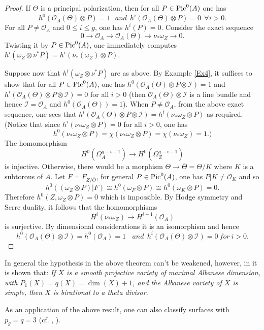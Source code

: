 \documentclass[10pt]{amsart}
\newcommand\Pic{{\text{\rm Pic}}}
\newcommand\lra{\longrightarrow}
\newcommand\ot{{\otimes}}
\newcommand\OO{{\mathcal{O}}}
\newcommand\II{{\mathcal{I}}}
\begin{document}
\begin{proof} If $\Theta$ is a principal polarization, then
for all $P\in \Pic ^0(A)$ one has $$h^0(\OO _A(\Theta )\ot P)=1\ \ \  and
\ \ h^i(\OO _A(\Theta )\ot P)=0\ \  \forall i>0.$$
For all $P\ne \OO _A$ and $0\leq i\leq g$, one has $h^i(P)=0$.
Consider the exact sequence
$$0\lra \OO _A \lra \OO _A (\Theta )\lra \nu _*\omega _Z\lra 0.$$
Twisting it by $P\in \Pic ^0(A)$, one immediately computes
$h^i(\omega _Z \ot \nu ^* P)=h^i(\nu _*(\omega _Z )\ot P)$.

Suppose now that $h^i(\omega _Z \ot \nu ^* P)$ are as above.
By Example \ref{Ex4}, 
it suffices to show that for all $P\in \Pic ^0(A)$, one has
$h^0(\OO _A(\Theta )\ot P \ot \II )=1$ and
$h^i(\OO _A (\Theta )\ot P \ot \II )=0$ for all $i>0$
(then $\OO _A (\Theta )\ot \II$ is a line bundle and hence $\II=\OO _A$
and $h^0(\OO _A(\Theta ))=1$).
When $P\ne \OO _A$, from the above exact sequence, one sees that 
$h^i(\OO _A (\Theta )\ot P \ot \II )=h^i(\nu _*\omega _Z \ot P)$
as required. (Notice that since $h^i(\nu _*\omega _Z \ot P)=0$ for
all $i>0$, one has $$h^0(\nu _*\omega _Z \ot P)=\chi (\nu _*\omega _Z \ot P)=
\chi (\nu _*\omega _Z)=1.)$$
The homomorphism $$H^0(\Omega _A^{g-i-1})\lra 
H^0(\Omega _Z ^{g-i-1})$$ is injective.
Otherwise, there would be a morphism $\Theta \lra \bar{\Theta}=
\Theta /K$ where $K$ is a subtorous of $A$. Let $F=F_{Z/\bar{\Theta }}$,
for general $P\in \Pic ^0(A)$, one has $P|K\ne \OO _K$
and so $$h^0((\omega _Z\ot P)|F)\cong h^0(\omega _F\ot P)\cong
h^0(\omega _K \ot P)=0.$$
Therefore $h^0(Z,\omega _Z \ot P)=0$ which is impossible. 
By Hodge symmetry and Serre duality, it follows that
the homomorphisms $$H^i(\nu _* \omega _Z)\lra H^{i+1}(\OO _A)$$
is surjective. By dimensional considerations it 
is an isomorphism and hence $$h^0(\OO _A(\Theta ) \ot \II )
=h^0(\OO _A)=1\ \ \ \   and\  
\ h^i(\OO _A(\Theta ) \ot \II )=0\ for \ i>0.$$ 
\end{proof}

In general the hypothesis in the above theorem can't be weakened,
however, in \cite{HP1} it is shown that: {\em If $X$ is a smooth
projective variety of maximal Albanese dimension, with 
$P_1(X)=q(X)=\dim (X)+1$, and the Albanese variety of $X$ is simple,
then $X$ is birational to a theta divisor.}

As an application of the above result, one can also classify
surfaces with $p_g=q=3$ (cf. \cite{HP2}, \cite{Pi}). 
\newpage
\end{document}
